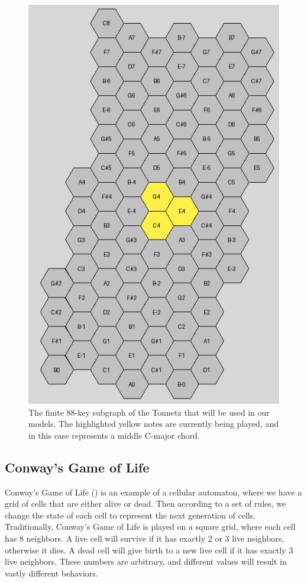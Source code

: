 \documentclass[
	a4paper, %
	10pt, %
	unnumberedsections, %
	twoside, %
]{LTJournalArticle}
\begin{document}
\begin{figure}
    \centering
    \includegraphics[width=0.8\linewidth]{images/tonnetz-finite.png}
    \caption{The finite 88-key subgraph of the Tonnetz that will be used in our models. The highlighted yellow notes are currently being played, and in this case represents a middle C-major chord.}
    \label{fig:tonnetz-finite}
\end{figure}

\subsection{Conway's Game of Life}

Conway's Game of Life (\textcite{bays_introduction_2010}) is an example of a cellular automaton, where we have a grid of cells that are either alive or dead. Then according to a set of rules, we change the state of each cell to represent the next generation of cells. Traditionally, Conway's Game of Life is played on a square grid, where each cell has 8 neighbors. A live cell will survive if it has exactly 2 or 3 live neighbors, otherwise it dies. A dead cell will give birth to a new live cell if it has exactly 3 live neighbors. These numbers are arbitrary, and different values will result in vastly different behaviors.
\end{document}
